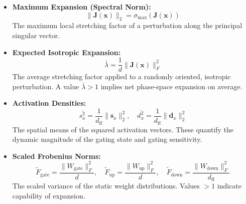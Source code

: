 \documentclass[a4paper,12pt]{article}
\begin{document}
    \begin{itemize}
        \item \textbf{Maximum Expansion (Spectral Norm):} 
        \begin{equation}
            \|\mathbf{J}(\mathbf{x})\|_2 = \sigma_{\max}(\mathbf{J}(\mathbf{x}))
        \end{equation}
        The maximum local stretching factor of a perturbation along the principal singular vector.
        
        \item \textbf{Expected Isotropic Expansion:} 
        \begin{equation}
            \bar{\lambda} = \frac{1}{d} \|\mathbf{J}(\mathbf{x})\|_F^2
        \end{equation}
        The average stretching factor applied to a randomly oriented, isotropic perturbation. A value $\bar{\lambda} > 1$ implies net phase-space expansion on average.
        
        \item \textbf{Activation Densities:} 
        \begin{equation}
            \overline{s_x^2} = \frac{1}{d_{\text{ff}}} \|\mathbf{s}_x\|_2^2, \quad \overline{d_x^2} = \frac{1}{d_{\text{ff}}} \|\mathbf{d}_x\|_2^2
        \end{equation}
        The spatial means of the squared activation vectors. These quantify the dynamic magnitude of the gating state and gating sensitivity. 
        
        \item \textbf{Scaled Frobenius Norms:} 
        \begin{equation}
            \tilde{F}_{\text{gate}} = \frac{\|W_{\text{gate}}\|_F^2}{d}, \quad \tilde{F}_{\text{up}} = \frac{\|W_{\text{up}}\|_F^2}{d}, \quad \tilde{F}_{\text{down}} = \frac{\|W_{\text{down}}\|_F^2}{d_{\text{ff}}}
        \end{equation}
        The scaled variance of the static weight distributions. Values $>1$ indicate capability of expansion. 
        
    \end{itemize}
\end{document}
